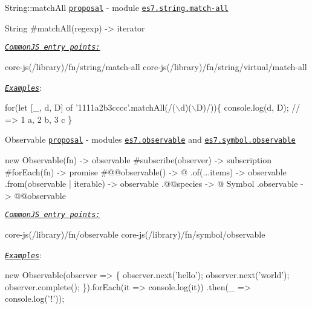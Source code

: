 \begin{DoxyItemize}
\item {\ttfamily String\+::match\+All} \href{https://github.com/tc39/String.prototype.matchAll}{\tt proposal} -\/ module \href{https://github.com/zloirock/core-js/blob/v2.6.0/modules/es7.string.match-all.js}{\tt {\ttfamily es7.\+string.\+match-\/all}} 
\begin{DoxyCode}
String
  #matchAll(regexp) -> iterator
\end{DoxyCode}
 \href{#commonjs}{\tt {\itshape Common\+JS entry points\+:}} 
\begin{DoxyCode}
core-js(/library)/fn/string/match-all
core-js(/library)/fn/string/virtual/match-all
\end{DoxyCode}
 \href{http://goo.gl/6kp9EB}{\tt {\itshape Examples}}\+: 
\begin{DoxyCode}
for(let [\_, d, D] of '1111a2b3cccc'.matchAll(/(\(\backslash\)d)(\(\backslash\)D)/))\{
  console.log(d, D); // => 1 a, 2 b, 3 c
\}
\end{DoxyCode}

\item {\ttfamily Observable} \href{https://github.com/zenparsing/es-observable}{\tt proposal} -\/ modules \href{https://github.com/zloirock/core-js/blob/v2.6.0/modules/es7.observable.js}{\tt {\ttfamily es7.\+observable}} and \href{https://github.com/zloirock/core-js/blob/v2.6.0/modules/es7.symbol.observable.js}{\tt {\ttfamily es7.\+symbol.\+observable}} 
\begin{DoxyCode}
new Observable(fn)             -> observable
  #subscribe(observer)         -> subscription
  #forEach(fn)                 -> promise
  #@@observable()              -> @
  .of(...items)                -> observable
  .from(observable | iterable) -> observable
  .@@species                   -> @
Symbol
  .observable                  -> @@observable
\end{DoxyCode}
 \href{#commonjs}{\tt {\itshape Common\+JS entry points\+:}} 
\begin{DoxyCode}
core-js(/library)/fn/observable
core-js(/library)/fn/symbol/observable
\end{DoxyCode}
 \href{http://goo.gl/1LDywi}{\tt {\itshape Examples}}\+: 
\begin{DoxyCode}
new Observable(observer => \{
  observer.next('hello');
  observer.next('world');
  observer.complete();
\}).forEach(it => console.log(it))
  .then(\_ => console.log('!'));
\end{DoxyCode}


\end{DoxyItemize}
